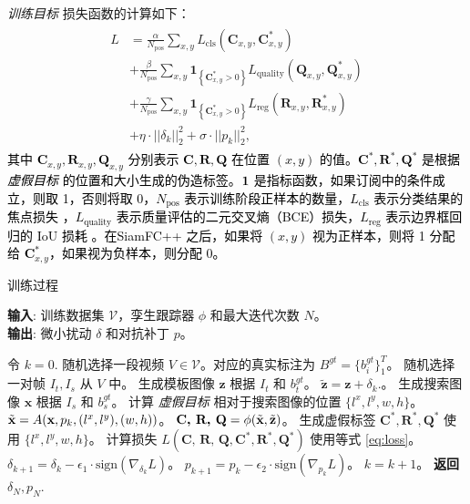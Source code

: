 \textit{训练目标} 损失函数的计算如下：
\begin{equation}
\begin{array}{l}
\begin{aligned}
L&=\frac{\alpha}{N_{\mathrm{pos}}} \sum_{x, y} L_{\mathrm{cls}}\left(\textbf{C}_{x, y}, \textbf{C}_{x, y}^{*}\right) \\
&+\frac{\beta}{N_{\mathrm{pos}}} \sum_{x, y} \textbf{1}_{\left\{\textbf{C}_{x, y}^{*}>0\right\}} L_{\mathrm{quality}}\left(\textbf{Q}_{x, y}, \textbf{Q}_{x, y}^{*}\right) \\
&+\frac{\gamma}{N_{\mathrm{pos}}} \sum_{x, y} \textbf{1}_{\left\{\textbf{C}_{x, y}^{*}>0\right\}} L_{\mathrm{reg}}\left(\textbf{R}_{x, y}, \textbf{R}_{x, y}^{*}\right) \\
&+\eta \cdot ||\delta_k||_2^2 +  \sigma \cdot ||p_k||^2_2,
\end{aligned}
\end{array}
\label{eq:loss}
\end{equation}
\textcolor{black} %
{其中 $\textbf{C}_{x, y}, \textbf{R}_{x, y}, \textbf{Q}_{x, y}$ 分别表示 $\textbf{C}, \textbf{R}, \textbf{Q}$ 在位置 $(x, y)$ 的值。$\textbf{C}^*, \textbf{R}^*, \textbf{Q}^*$ 是根据 \textit{虚假目标} 的位置和大小生成的伪造标签。$\textbf 1$ 是指标函数，如果订阅中的条件成立，则取 1，否则将取 0，$N_{\mathrm{pos}}$ 表示训练阶段正样本的数量，$L_{\mathrm{cls}}$ 表示分类结果的焦点损失 \cite{focal}，$L_{\mathrm{quality}}$ 表示质量评估的二元交叉熵（BCE）损失，$L_{\mathrm{reg}}$ 表示边界框回归的 IoU 损耗 \cite{iou-loss}。在SiamFC++ 之后，如果将 $(x, y)$ 视为正样本，则将 1 分配给 $\textbf{C}_{x, y}^{*}$，如果视为负样本，则分配 0。}

\begin{algorithm}[tb]
\caption{训练过程}
\label{alg:algorithm}
\textbf{输入}: 训练数据集 $\mathcal{V}$，孪生跟踪器 $\phi$ 和最大迭代次数 $N$。\\
\textbf{输出}: 微小扰动 $\delta$ 和对抗补丁 $p$。
\begin{algorithmic}[1] %
\State 令 $k = 0$.
\State 随机选择一段视频 $V\in \mathcal{V}$。对应的真实标注为 $B^{gt}=\{b^{gt}_i\}^T_1$。
\State 随机选择一对帧 $I_t, I_s$ 从 $V$ 中。
\State 生成模板图像 $\textbf{z}$ 根据 $I_t$ 和 $b^{gt}_t$。
\State $\tilde{\textbf{z}} = \textbf{z} + \delta_k.$。
\State 生成搜索图像 $\textbf{x}$ 根据 $I_s$ 和 $b^{gt}_s$。
\State 计算 \textit{虚假目标} 相对于搜索图像的位置 $\{l^x, l^y, w, h\}$。
\State $\tilde{\textbf x} = A(\textbf x, p_k, (l^x, l^y), (w, h))$。
\State $\textbf{C, R, Q} = \phi(\tilde {\textbf x}, \tilde{\textbf z})$。
\State 生成虚假标签 $\textbf{C}^*,\textbf{R}^*,\textbf{Q}^*$ 使用 $\{l^x, l^y, w, h\}$。
\State 计算损失 $L(\textbf{C, R, Q}, \textbf{C}^*, \textbf{R}^*, \textbf{Q}^*)$ 使用等式 \ref{eq:loss}。
\State $\delta_{k+1} = \delta_{k} - \epsilon_1 \cdot \text{sign}(\nabla_{\delta_k}L)$。
\State $p_{k+1} = p_{k} - \epsilon_2 \cdot \text{sign}(\nabla_{p_k}L)$。
\State $k = k + 1$。
\EndWhile
\State \textbf{返回} $\delta_N, p_N.$
\end{algorithmic}
\label{alg}
\end{algorithm}

